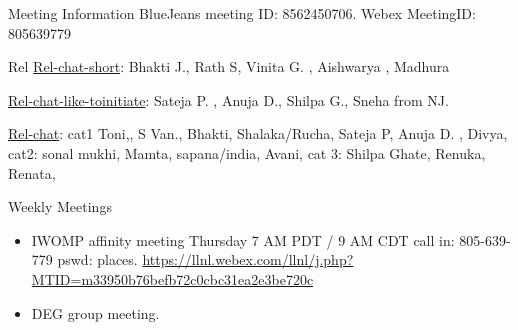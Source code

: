 \begin{columns}
\begin{column}{0.6\linewidth}
\begin{block}{Meeting Information}
BlueJeans meeting ID: 8562450706.
Webex MeetingID: 805639779  
\end{block} 




\begin{block}{Rel}
\underline{Rel-chat-short}: Bhakti J., Rath S, Vinita G. , Aishwarya , Madhura

\underline{Rel-chat-like-toinitiate}: Sateja P. , Anuja D., Shilpa G., Sneha from NJ. 

\underline{Rel-chat}:  cat1  Toni,, S Van., Bhakti, Shalaka/Rucha, Sateja P, Anuja
D. ,  Divya, cat2: sonal mukhi, Mamta, sapana/india, Avani, cat 3:
Shilpa Ghate, Renuka, Renata, 
\end{block}

  
  \begin{block}{Weekly Meetings}
    \begin{itemize}
      \tiny \item \tiny IWOMP affinity meeting Thursday 7 AM PDT / 9 AM
      CDT call in: 805-639-779 pswd: places. \url{https://llnl.webex.com/llnl/j.php?MTID=m33950b76befb72c0cbc31ea2e3be720c}
    \item \tiny DEG group meeting.          \end{itemize}
  \end{block} 


\end{column}
\end{columns}
